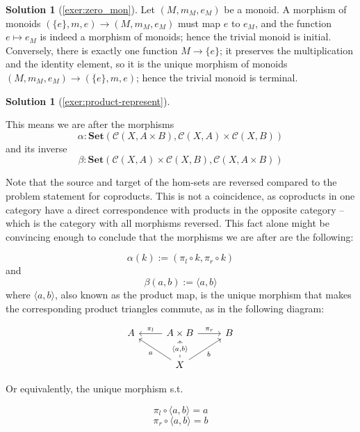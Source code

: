 \documentclass[a4paper,11pt, oneside,titlepage=false]{scrbook}
\theoremstyle{plain}
\theoremstyle{definition}
\newtheorem{solution}[thm]{Solution}
\newcommand{\Cat}[1]{\mathcal{#1}}
\newcommand{\CC}{\Cat{C}}
\newcommand{\Catb}[1]{\mathbf{#1}}
\newcommand{\SET}{\Catb{Set}}
\newcommand{\projl}{\ensuremath{\pi_l}}
\newcommand{\projr}{\ensuremath{\pi_r}}
\newcommand{\intoproduct}[2]{\ensuremath{\langle #1, #2 \rangle}}
\newcommand{\co}[2]{\ensuremath{#2 \circ #1}}
\begin{document}
\begin{solution}[\cref{exer:zero_mon}]\label{sol:zero_mon}
  Let $(M, m_M, e_M)$ be a monoid.
  A morphism of monoids $(\{e\},m,e) \to (M,m_M,e_M)$ must map $e$ to $e_M$,
  and the function $e \mapsto e_M$ is indeed a morphism of monoids; hence the
  trivial monoid is initial.
  Conversely, there is exactly one function $M \to \{e\}$; it preserves the
  multiplication and the identity element, so it is the unique morphism of
  monoids $(M,m_M,e_M) \to (\{e\},m,e)$; hence the trivial monoid is terminal.
\end{solution}

\begin{solution}[\cref{exer:product-represent}]\label{sol:product-represent}
\newcommand{\CP}{\CC(A+B,X)}
\newcommand{\CQ}{\CC(A,X)\times\CC(B,X)}
\newcommand{\PP}{\CC(X,A\times B)}
\newcommand{\PQ}{\CC(X,A)\times\CC(X,B)}

This means we are after the morphisms \[\alpha:\SET(\PP, \PQ)\] and its inverse \[\beta:\SET(\PQ, \PP)\]

Note that the source and target of the hom-sets are reversed compared to the problem statement for coproducts. This is not a coincidence, as coproducts in one category have a direct correspondence with products in the opposite category -- which is the category with all morphisms reversed. This fact alone might be convincing enough to conclude that the morphisms we are after are the following:

\[\alpha(k):=(\co {k} {\projl}, \co {k} {\projr})\] and \[\beta(a,b) := \intoproduct{a}{b}\] where $\intoproduct{a}{b}$, also known as the product map, is the unique morphism that makes the corresponding product triangles commute, as in the following diagram:

\[
\begin{tikzcd}
A & A\times B \arrow[r, "\pi_r"] \arrow[l, "\pi_l"']                    & B \\
	& X \arrow[u, "{\langle a,b\rangle}" description] \arrow[ru, "b"'] \arrow[lu, "a"] &
\end{tikzcd}
\]

Or equivalently, the unique morphism s.t.

\begin{equation}
\label{ga2}
	\co {\intoproduct{a}{b}} {\projl} = a
\end{equation}
\begin{equation}
\label{gb2}
	\co {\intoproduct{a}{b}} {\projr} = b
\end{equation}


\end{solution}
\end{document}
